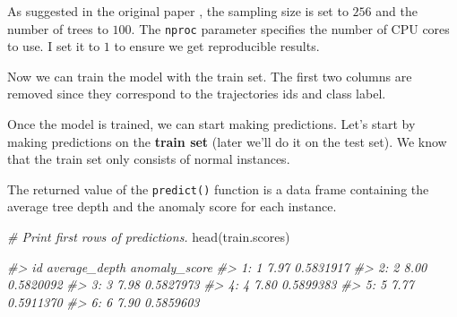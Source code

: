\documentclass[
  11pt,
]{krantz}
\newenvironment{Shaded}{\begin{snugshade}}{\end{snugshade}}
\newcommand{\CommentTok}[1]{\textcolor[rgb]{0.37,0.37,0.37}{\textit{#1}}}
\newcommand{\DecValTok}[1]{\textcolor[rgb]{0.06,0.06,0.06}{#1}}
\newcommand{\FunctionTok}[1]{\textcolor[rgb]{0,0,0}{#1}}
\newcommand{\NormalTok}[1]{#1}
\newcommand{\OtherTok}[1]{\textcolor[rgb]{0.37,0.37,0.37}{#1}}
\newcommand{\SpecialCharTok}[1]{\textcolor[rgb]{0,0,0}{#1}}
\begin{document}
As suggested in the original paper \citep{Liu2008isolation}, the sampling size is set to \(256\) and the number of trees to \(100\). The \texttt{nproc} parameter specifies the number of CPU cores to use. I set it to \(1\) to ensure we get reproducible results.

Now we can train the model with the train set. The first two columns are removed since they correspond to the trajectories ids and class label.

\begin{Shaded}
\end{Shaded}

Once the model is trained, we can start making predictions. Let's start by making predictions on the \textbf{train set} (later we'll do it on the test set). We know that the train set only consists of normal instances.

\begin{Shaded}
\end{Shaded}

The returned value of the \texttt{predict()} function is a data frame containing the average tree depth and the anomaly score for each instance.

\begin{Shaded}
\begin{Highlighting}[]
\CommentTok{\# Print first rows of predictions.}
\FunctionTok{head}\NormalTok{(train.scores)}

\CommentTok{\#\textgreater{}    id average\_depth anomaly\_score}
\CommentTok{\#\textgreater{} 1:  1          7.97     0.5831917}
\CommentTok{\#\textgreater{} 2:  2          8.00     0.5820092}
\CommentTok{\#\textgreater{} 3:  3          7.98     0.5827973}
\CommentTok{\#\textgreater{} 4:  4          7.80     0.5899383}
\CommentTok{\#\textgreater{} 5:  5          7.77     0.5911370}
\CommentTok{\#\textgreater{} 6:  6          7.90     0.5859603}
\end{Highlighting}
\end{Shaded}
\end{document}

